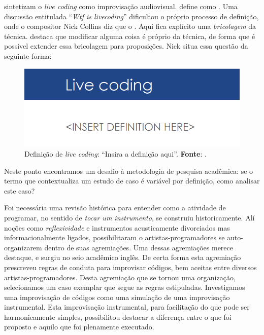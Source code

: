  sintetizam o \emph{live coding} como improvisação audiovisual.  define como . Uma discussão entitulada ``\emph{Wtf is livecoding}'' dificultou o próprio processo de definição, onde o compositor Nick Collins diz que o . Aqui fica explícito uma \emph{bricolagem} da técnica.  destaca que modificar alguma coisa é próprio da técnica, de forma que é possível extender essa bricolagem para proposições. Nick  situa essa questão da seguinte forma:

  \begin{figure}[h]
    \centering
    \includegraphics[scale=0.7]{imagens/live_coding_def.png}
    \caption{Definição de \emph{live coding}: ``Insira a definição aqui''. \textbf{Fonte}: .}
    \label{fig:live_coding_def}
  \end{figure}

Neste ponto encontramos um desafio à metodologia de pesquisa acadêmica: se o termo que contextualiza um estudo de caso é variável por definição, como analisar este caso? 

Foi necessária uma revisão histórica para entender como a atividade de programar, no sentido de \emph{tocar um instrumento}, se construiu historicamente. Alí noções como \emph{reflexividade} e instrumentos acusticamente divorciados mas informacionalmente ligados, possibilitaram o artistas-programadores se auto-organizarem dentro de suas agremiações. Uma dessas agremiações merece destaque, e surgiu no seio acadêmico inglês. De certa forma esta agremiação prescreveu regras de conduta para improvisar códigos, bem aceitas entre diversos artistas-programadores. Desta agremiação que se tornou uma organização, selecionamos um caso exemplar que segue as regras estipuladas. Investigamos uma improvisação de códigos como uma simulação de uma improvisação instrumental. Esta improvisação instrumental, para facilitação do que pode ser harmonicamente simples, possibilitou destacar a diferença entre o que foi proposto e aquilo que foi plenamente executado.

